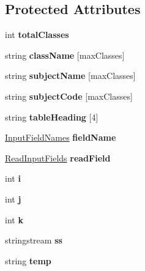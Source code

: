 \subsection*{Protected Attributes}
\begin{DoxyCompactItemize}
\item 
\hypertarget{classClassDetails_a9bea81a0e09229c7060a592af6321b26}{int {\bfseries total\-Classes}}\label{classClassDetails_a9bea81a0e09229c7060a592af6321b26}

\item 
string {\bfseries class\-Name} \mbox{[}max\-Classes\mbox{]}
\item 
string {\bfseries subject\-Name} \mbox{[}max\-Classes\mbox{]}
\item 
string {\bfseries subject\-Code} \mbox{[}max\-Classes\mbox{]}
\item 
string {\bfseries table\-Heading} \mbox{[}4\mbox{]}
\item 
\hypertarget{classClassDetails_a53e447a55d35c02dcb02c6553380697e}{\hyperlink{classInputFieldNames}{Input\-Field\-Names} {\bfseries field\-Name}}\label{classClassDetails_a53e447a55d35c02dcb02c6553380697e}

\item 
\hypertarget{classClassDetails_a76dd2ba9e99ef8c24083a4b770003b07}{\hyperlink{classReadInputFields}{Read\-Input\-Fields} {\bfseries read\-Field}}\label{classClassDetails_a76dd2ba9e99ef8c24083a4b770003b07}

\item 
\hypertarget{classClassDetails_ab9f71f35c7f01ccbc4bfcd7e9f5ba28b}{int {\bfseries i}}\label{classClassDetails_ab9f71f35c7f01ccbc4bfcd7e9f5ba28b}

\item 
\hypertarget{classClassDetails_a57e44148f58db012a1cea587a09e2a4c}{int {\bfseries j}}\label{classClassDetails_a57e44148f58db012a1cea587a09e2a4c}

\item 
\hypertarget{classClassDetails_a1f87d306010f98019f49d965e15e8104}{int {\bfseries k}}\label{classClassDetails_a1f87d306010f98019f49d965e15e8104}

\item 
\hypertarget{classClassDetails_a0d3938ba9270a39f0579bd8fbe0cae0b}{stringstream {\bfseries ss}}\label{classClassDetails_a0d3938ba9270a39f0579bd8fbe0cae0b}

\item 
\hypertarget{classClassDetails_ade1a7d32883434c1a994c7c04a275d3d}{string {\bfseries temp}}\label{classClassDetails_ade1a7d32883434c1a994c7c04a275d3d}


\end{DoxyCompactItemize}
